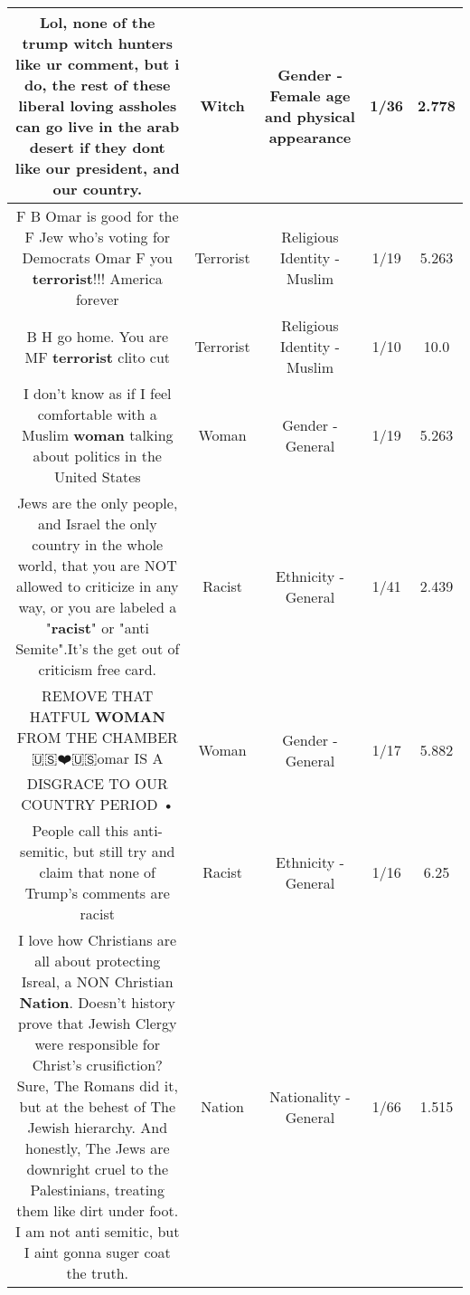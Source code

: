 \documentclass[11pt]{article}
\newlength\mylength
\begin{document}
\begin{center}
\begin{longtable}{|C{.65\mylength}|C{.30\mylength}|C{.12\mylength}|C{.12\mylength}|C{.12\mylength}|}
  \small Lol, none of the trump \textbf{witch} hunters like ur comment, but i do, the rest of these liberal loving assholes can go live in the arab desert if they dont like our president, and our country.\normalsize   & Witch & Gender - Female age and physical appearance & 1/36 & 2.778 \\  \hline
  \small F B Omar is good for the F Jew who's voting for Democrats  Omar F you \textbf{terrorist}!!! America forever\normalsize   & Terrorist & Religious Identity - Muslim & 1/19 & 5.263 \\  \hline
  \small B H go home. You are MF \textbf{terrorist} clito cut\normalsize   & Terrorist & Religious Identity - Muslim & 1/10 & 10.0 \\  \hline
  \small I don't know as if I feel comfortable with a Muslim \textbf{woman} talking about politics in the United States\normalsize   & Woman & Gender - General & 1/19 & 5.263 \\  \hline
  \small Jews are the only people, and Israel the only country in the whole world, that you are NOT allowed to criticize in any way, or you are labeled a "\textbf{racist}" or "anti Semite".It's the get out of criticism free card.\normalsize   & Racist & Ethnicity - General & 1/41 & 2.439 \\  \hline
  \small REMOVE THAT HATFUL \textbf{WOMAN} FROM THE CHAMBER 🇺🇸❤️🇺🇸omar IS A DISGRACE TO OUR COUNTRY PERIOD •\normalsize   & Woman & Gender - General & 1/17 & 5.882 \\  \hline
  \small People call this anti-semitic, but still try and claim that none of Trump's comments are racist\normalsize   & Racist & Ethnicity - General & 1/16 & 6.25 \\  \hline
  \small I love how Christians are all about protecting Isreal, a NON Christian \textbf{Nation}. Doesn't history prove that Jewish Clergy were responsible for Christ's crusifiction? Sure, The Romans did it, but at the behest of The Jewish hierarchy. And honestly, The Jews are downright cruel to the Palestinians, treating them like dirt under foot. I am not anti semitic, but I aint gonna suger coat the truth.\normalsize   & Nation & Nationality - General & 1/66 & 1.515 \\  \hline

\end{longtable}
\end{center}
\end{document}
